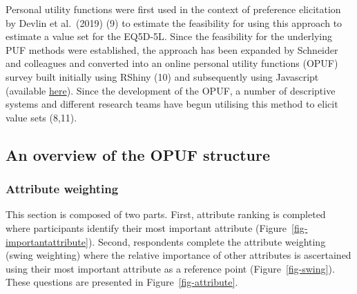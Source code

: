 \documentclass[
  letterpaper,
  DIV=11,
  numbers=noendperiod]{scrartcl}
\begin{document}
Personal utility functions were first used in the context of preference
elicitation by Devlin et al.~(2019) (9) to estimate the feasibility for
using this approach to estimate a value set for the EQ5D-5L. Since the
feasibility for the underlying PUF methods were established, the
approach has been expanded by Schneider and colleagues and converted
into an online personal utility functions (OPUF) survey built initially
using RShiny (10) and subsequently using Javascript (available
\href{https://eq5d5l.me}{here}). Since the development of the OPUF, a
number of descriptive systems and different research teams have begun
utilising this method to elicit value sets (8,11).

\subsection{An overview of the OPUF
structure}\label{an-overview-of-the-opuf-structure}

\subsubsection{Attribute weighting}\label{attribute-weighting}

This section is composed of two parts. First, attribute ranking is
completed where participants identify their most important attribute
(Figure~\ref{fig-importantattribute}). Second, respondents complete the
attribute weighting (swing weighting) where the relative importance of
other attributes is ascertained using their most important attribute as
a reference point (Figure~\ref{fig-swing}). These questions are
presented in Figure~\ref{fig-attribute}.
\end{document}
